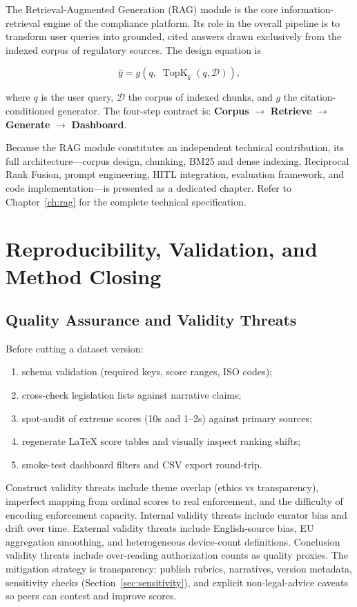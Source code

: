 The Retrieval-Augmented Generation (RAG) module is the core information-retrieval
engine of the compliance platform. Its role in the overall pipeline is to transform
user queries into grounded, cited answers drawn exclusively from the indexed corpus
of regulatory sources. The design equation is

\begin{equation}
\hat{y} = g\!\left(q,\;\operatorname{TopK}_k(q,\mathcal{D})\right),
\end{equation}

where $q$ is the user query, $\mathcal{D}$ the corpus of indexed chunks, and $g$ the
citation-conditioned generator. The four-step contract is: \textbf{Corpus}
$\to$ \textbf{Retrieve} $\to$ \textbf{Generate} $\to$ \textbf{Dashboard}.

Because the RAG module constitutes an independent technical contribution, its full
architecture---corpus design, chunking, BM25 and dense indexing, Reciprocal Rank
Fusion, prompt engineering, HITL integration, evaluation framework, and code
implementation---is presented as a dedicated chapter. Refer to
Chapter~\ref{ch:rag} for the complete technical specification.

\section{Reproducibility, Validation, and Method Closing}
\label{sec:method-closing}

\subsection{Quality Assurance and Validity Threats}
\label{sec:qa}

Before cutting a dataset version:
\begin{enumerate}[noitemsep]
  \item schema validation (required keys, score ranges, ISO codes);
  \item cross-check legislation lists against narrative claims;
  \item spot-audit of extreme scores (10s and 1--2s) against primary sources;
  \item regenerate LaTeX score tables and visually inspect ranking shifts;
  \item smoke-test dashboard filters and CSV export round-trip.
\end{enumerate}
Construct validity threats include theme overlap (ethics vs transparency), imperfect mapping from ordinal scores to real enforcement, and the difficulty of encoding enforcement capacity. Internal validity threats include curator bias and drift over time. External validity threats include English-source bias, EU aggregation smoothing, and heterogeneous device-count definitions. Conclusion validity threats include over-reading authorization counts as quality proxies. The mitigation strategy is transparency: publish rubrics, narratives, version metadata, sensitivity checks (Section~\ref{sec:sensitivity}), and explicit non-legal-advice caveats so peers can contest and improve scores.

